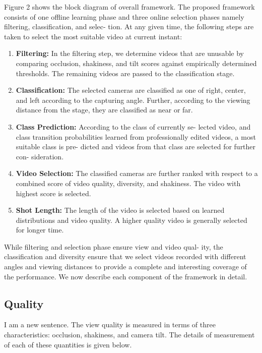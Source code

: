 \documentclass{sig-alternate}
\begin{document}
Figure 2 shows the block diagram of overall framework. The
proposed framework consists of one offline learning phase and three
online selection phases namely filtering, classification, and selec-
tion. At any given time, the following steps are taken to select the
most suitable video at current instant:
\begin{enumerate}
\item \textbf{Filtering:} In the filtering step, we determine videos that are
unusable by comparing occlusion, shakiness, and tilt scores
against empirically determined thresholds. The remaining
videos are passed to the classification stage.
\item \textbf{Classification:} The selected cameras are classified as one
of right, center, and left according to the capturing angle.
Further, according to the viewing distance from the stage,
they are classified as near or far.
\item \textbf{Class Prediction:} According to the class of currently se-
lected video, and class transition probabilities learned from
professionally edited videos, a most suitable class is pre-
dicted and videos from that class are selected for further con-
sideration.
\item \textbf{Video Selection:} The classified cameras are further ranked
with respect to a combined score of video quality, diversity,
and shakiness. The video with highest score is selected.
\item \textbf{Shot Length:} The length of the video is selected based on
learned distributions and video quality. A higher quality video
is generally selected for longer time.
\end{enumerate}

While filtering and selection phase ensure view and video qual-
ity, the classification and diversity ensure that we select videos
recorded with different angles and viewing distances to provide a
complete and interesting coverage of the performance. We now
describe each component of the framework in detail.

\subsection{Quality}
I am a new sentence.
The view quality is measured in terms of three characteristics:
occlusion, shakiness, and camera tilt. The details of measurement
of each of these quantities is given below.
\end{document}
